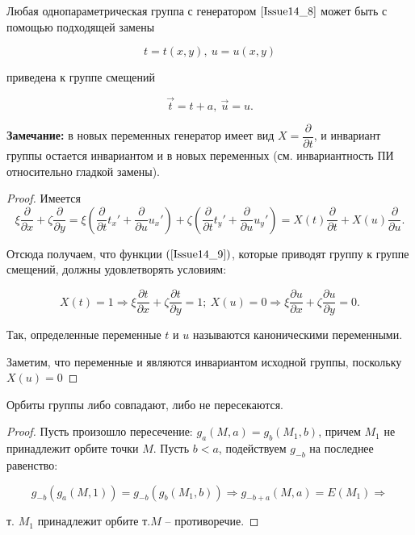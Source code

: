 \begin{theorem}
Любая однопараметрическая группа с генератором $\ref{Issue14_8}$ может быть с помощью подходящей замены 

\begin{equation}
	t = t(x,y),\ u = u(x,y)
	\label{Issue14_9}
\end{equation}

приведена к группе смещений 

\begin{equation}
	\vec{t} = t + a,\ \vec{u} = u.
	\label{Issue14_10}
\end{equation}

\textbf{Замечание:} в новых переменных генератор имеет вид $X = \dfrac{\partial}{\partial t}$, и инвариант группы остается инвариантом и в новых переменных (см. инвариантность ПИ относительно гладкой замены).

\begin{proof}

Имеется \[\xi \dfrac{\partial}{\partial x} + \zeta \dfrac{\partial}{\partial y} = \xi(\dfrac{\partial}{\partial t}t_x' + \dfrac{\partial}{\partial u}u_x') + \zeta(\dfrac{\partial}{\partial t}t_y' + \dfrac{\partial}{\partial u}u_y') = X(t)\dfrac{\partial}{\partial t} + X(u)\dfrac{\partial}{\partial u}.\]

Отсюда получаем, что функции $(\ref{Issue14_9})$, которые приводят группу к группе смещений, должны удовлетворять условиям:

\begin{equation}
	X(t) = 1 \Rightarrow \xi \dfrac{\partial t}{\partial x} + \zeta \dfrac{\partial t}{\partial y} = 1;\ X(u) = 0 \Rightarrow \xi \dfrac{\partial u}{\partial x} + \zeta \dfrac{\partial u}{\partial y} = 0.
	\label{Issue14_11}
\end{equation}

Так, определенные переменные $t$ и $u$ называются $\textbf{каноническими переменными}$.

Заметим, что переменные и являются инвариантом исходной группы, поскольку \\
 $X(u) = 0$

\end{proof}
\end{theorem} 


\begin{theorem}

Орбиты группы либо совпадают, либо не пересекаются.

\begin{proof}

Пусть произошло пересечение: $g_a(M,a) = g_b(M_1,b)$, причем $M_1$ не принадлежит орбите точки $M$. Пусть $b < a$, подействуем $g_{-b}$ на последнее равенство:

\[ g_{-b}(g_a(M,1)) = g_{-b}(g_b(M_1, b)) \Rightarrow g_{-b+a}(M,a) = E(M_1) \Rightarrow\]

т. $M_1$ принадлежит орбите т.$M$ -- противоречие.

\end{proof}

\end{theorem}


